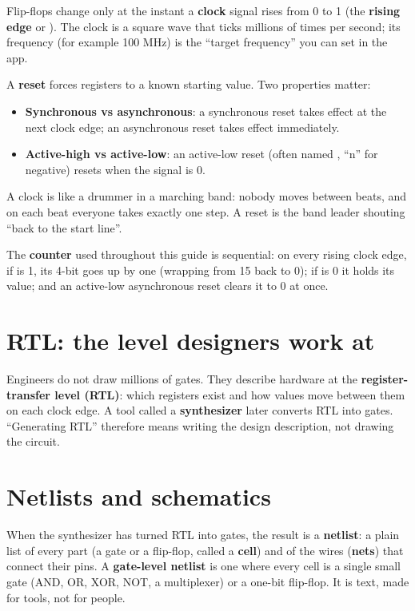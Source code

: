 Flip-flops change only at the instant a \textbf{clock} signal rises from 0 to 1 (the \textbf{rising edge} or ). The clock is a square wave that ticks millions of times per second; its frequency (for example 100 MHz) is the ``target frequency'' you can set in the app.

A \textbf{reset} forces registers to a known starting value. Two properties matter:

\begin{itemize}
  \item \textbf{Synchronous vs asynchronous}: a synchronous reset takes effect at the next clock edge; an asynchronous reset takes effect immediately.
  \item \textbf{Active-high vs active-low}: an active-low reset (often named , ``n'' for negative) resets when the signal is 0.
\end{itemize}

\begin{analogy}
A clock is like a drummer in a marching band: nobody moves between beats, and on each beat everyone takes exactly one step. A reset is the band leader shouting ``back to the start line''.
\end{analogy}

The \textbf{counter} used throughout this guide is sequential: on every rising clock edge, if  is 1, its 4-bit  goes up by one (wrapping from 15 back to 0); if  is 0 it holds its value; and an active-low asynchronous reset clears it to 0 at once.

\section{RTL: the level designers work at}

Engineers do not draw millions of gates. They describe hardware at the \textbf{register-transfer level (RTL)}: which registers exist and how values move between them on each clock edge. A tool called a \textbf{synthesizer} later converts RTL into gates. ``Generating RTL'' therefore means writing the design description, not drawing the circuit.

\section{Netlists and schematics}
\label{sec:netlist}

When the synthesizer has turned RTL into gates, the result is a \textbf{netlist}: a plain list of every part (a gate or a flip-flop, called a \textbf{cell}) and of the wires (\textbf{nets}) that connect their pins. A \textbf{gate-level netlist} is one where every cell is a single small gate (AND, OR, XOR, NOT, a multiplexer) or a one-bit flip-flop. It is text, made for tools, not for people.

